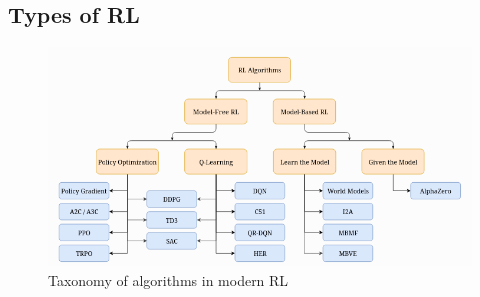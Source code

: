 \subsection{Types of \ac{RL}}


\begin{figure}[ht]
	\centering
	\includegraphics[width=0.75\linewidth]{./figures/rl_algorithms.png}
	\caption{Taxonomy of algorithms in modern \ac{RL} \cite{openaiSpinningDocumentation}}
	\label{fig:rl-algorithms}
\end{figure}

